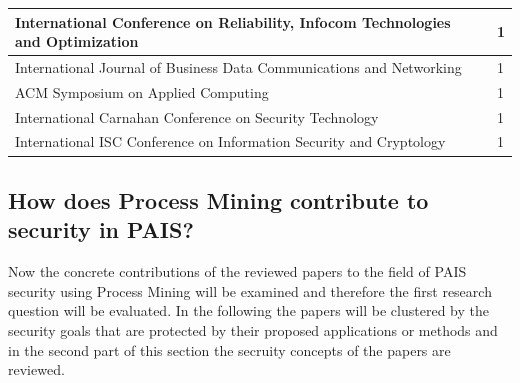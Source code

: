 \documentclass[runningheads]{llncs}
\begin{document}
\begin{table}
\begin{tabular}{ | m{9cm} | l | l |}
        \hline
        International Conference on Reliability, Infocom Technologies and Optimization       & \cite{Mishra2018613}                                                      & 1            \\
        \hline
        International Journal of Business Data Communications and Networking                 & \cite{Zhu201783}                                                          & 1            \\
        \hline
        ACM Symposium on Applied Computing                                                   & \cite{Accorsi20131462}                                                    & 1            \\
        \hline
        International Carnahan Conference on Security Technology                             & \cite{Talamo2013}                                                         & 1            \\
        \hline
        International ISC Conference on Information Security and Cryptology                  & \cite{Mardani2013}                                                        & 1            \\
        \hline
    \end{tabular}
\end{table}
\subsection{How does Process Mining contribute to security in PAIS?}\label{Q1}
Now the concrete contributions of the reviewed papers to the field of PAIS security using Process Mining will be examined and therefore the first research question will be evaluated. In the following
the papers will be clustered by the security goals that are protected by their proposed applications or methods and in the second part of this section the secruity concepts of the papers are reviewed.
\end{document}
